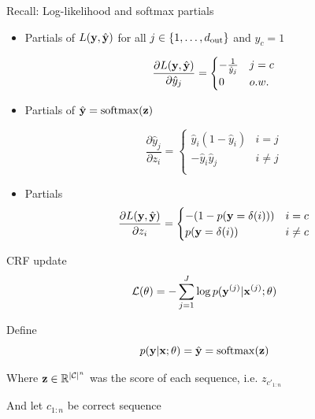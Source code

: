 \documentclass{beamer}
\begin{document}
 \begin{frame}{Recall: Log-likelihood and softmax partials}


     \begin{itemize}
     \item 
     Partials of $L(\mathbf{y}, \hat{\mathbf{y}})$ for all $j \in \{1, \ldots, {d_{\mathrm{out}}}\}$ and $y_c = 1$

     \[ \frac{\partial L(\mathbf{y}, \hat{\mathbf{y}})}{\partial \hat{y}_j} = \begin{cases}-\frac{1} {\hat{y}_j} & j = c\\ 0 & o.w. \end{cases}  \]

     \item 
    Partials of $\hat{\boldy} = \softmax(\boldz)$

  \[ \frac{\partial \hat{y}_j }{\partial z_i} =
    \begin{cases}
      \hat{y}_i (1 - \hat{y}_i) & i = j\\
      - \hat{y}_i \hat{y}_j & i \neq j \\
    \end{cases} \]

  \item Partials
  \[ \frac{\partial L(\mathbf{y}, \hat{\mathbf{y}}) }{\partial z_i} =
    \begin{cases}
     -(1 - p(\mathbf{y} = \delta(i))) & i = c\\
      p(\mathbf{y} = \delta(i))  & i \neq c \\
    \end{cases} \]

  \end{itemize}
 \end{frame}

 \begin{frame}{CRF update}
   \[ \mathcal{L}(\theta) =  - \sum_{ j=1}^J  \log p(\mathbf{y}^{(j)} | \mathbf{x}^{(j)}; \theta) \]
   \air
   
   Define 
   \[ p(\boldy | \boldx; \theta) = \hat{\boldy} = \softmax(\boldz) \]
   
   \air 

   Where $\mathbf{z} \in \mathbb{R}^{|\mathcal{C}|^n}$ was the score of each sequence, i.e. $z_{c'_{1:n}}$
   \air 

   And let $c_{1:n}$ be correct sequence

   
 \end{frame}
\end{document}
